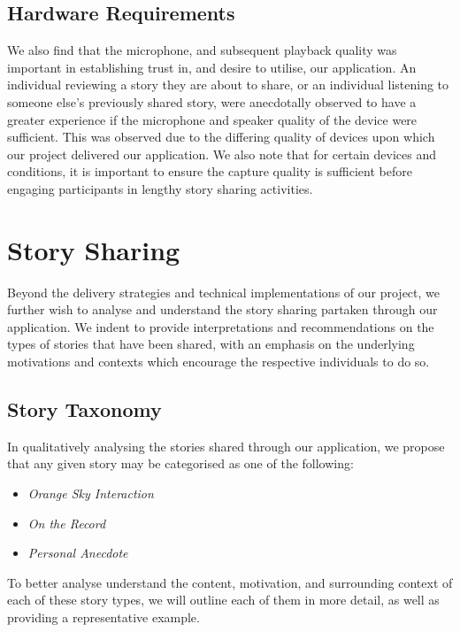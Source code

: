 \subsection{Hardware Requirements}

We also find that the microphone, and subsequent playback quality was important in establishing trust in, and desire to utilise, our application. An individual reviewing a story they are about to share, or an individual listening to someone else's previously shared story, were anecdotally observed to have a greater experience if the microphone and speaker quality of the device were sufficient. This was observed due to the differing quality of devices upon which our project delivered our application. We also note that for certain devices and conditions, it is important to ensure the capture quality is sufficient before engaging participants in lengthy story sharing activities.

\section{Story Sharing}

Beyond the delivery strategies and technical implementations of our project, we further wish to analyse and understand the story sharing partaken through our application. We indent to provide interpretations and recommendations on the types of stories that have been shared, with an emphasis on the underlying motivations and contexts which encourage the respective individuals to do so.

\subsection{Story Taxonomy}

In qualitatively analysing the stories shared through our application, we propose that any given story may be categorised as one of the following:

\begin{itemize}
    \item \emph{Orange Sky Interaction}
    \item \emph{On the Record}
    \item \emph{Personal Anecdote}
\end{itemize}

To better analyse understand the content, motivation, and surrounding context of each of these story types, we will outline each of them in more detail, as well as providing a representative example.

